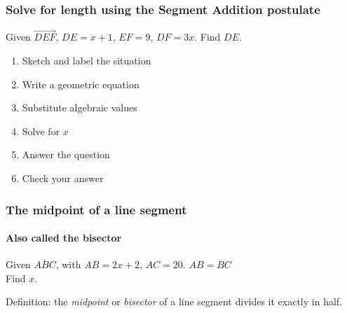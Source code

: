 \documentclass{beamer}
\begin{document}
  \frame
  {
    \frametitle{Solve for length using the Segment Addition postulate}
    
    Given $\overrightarrow{DEF}$, $DE=x+1$, $EF=9$, $DF=3x$. Find ${DE}$.\\[0.5in]
    \begin{center}   
    \end{center}
  \begin{enumerate}
      \item<2-> Sketch and label the situation\\
      \item<2-> Write a geometric equation\\
      \item<2-> Substitute algebraic values\\
      \item<2-> Solve for $x$\\
      \item<2-> Answer the question\\
      \item<2-> Check your answer
    \end{enumerate}
  }

  \frame
  {
    \frametitle{The midpoint of a line segment}
    \framesubtitle{Also called the bisector}
    Given $\overline{ABC}$, with $AB=2x+2$, $AC=20$. $AB=BC$ \\[0.15in]
    Find $x$.
      \begin{center}
      \end{center} \vspace{2cm}
      Definition: the \emph{midpoint} or \emph{bisector} of a line segment divides it exactly in half.
  }
\end{document}
